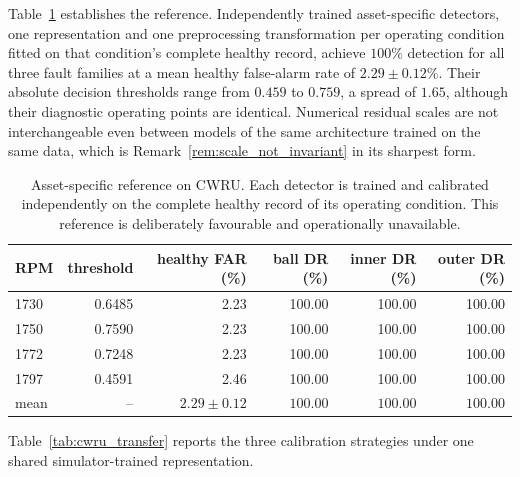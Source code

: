 \documentclass[a4paper]{cas-sc}
\begin{document}
Table~\ref{tab:cwru_oracle} establishes the reference. Independently trained
asset-specific detectors, one representation and one preprocessing
transformation per operating condition fitted on that condition's complete
healthy record, achieve \(100\%\) detection for all three fault families at a
mean healthy false-alarm rate of \(2.29\pm 0.12\%\). Their absolute decision
thresholds range from \(0.459\) to \(0.759\), a spread of \(1.65\), although
their diagnostic operating points are identical. Numerical residual scales are
not interchangeable even between models of the same architecture trained on
the same data, which is
Remark~\ref{rem:scale_not_invariant} in its sharpest form.

\begin{table}[!ht]
\centering
\caption{Asset-specific reference on CWRU. Each detector is trained and
calibrated independently on the complete healthy record of its operating
condition. This reference is deliberately favourable and operationally
unavailable.}
\label{tab:cwru_oracle}
\begin{tabular}{lrrrrr}
\toprule
RPM & threshold & healthy FAR (\%) & ball DR (\%) & inner DR (\%) & outer DR (\%) \\
\midrule
1730 & 0.6485 & 2.23 & 100.00 & 100.00 & 100.00 \\
1750 & 0.7590 & 2.23 & 100.00 & 100.00 & 100.00 \\
1772 & 0.7248 & 2.23 & 100.00 & 100.00 & 100.00 \\
1797 & 0.4591 & 2.46 & 100.00 & 100.00 & 100.00 \\
\midrule
mean & --     & $2.29\pm0.12$ & $100.00$ & $100.00$ & $100.00$ \\
\bottomrule
\end{tabular}
\end{table}

Table~\ref{tab:cwru_transfer} reports the three calibration strategies under
one shared simulator-trained representation.
\end{document}
